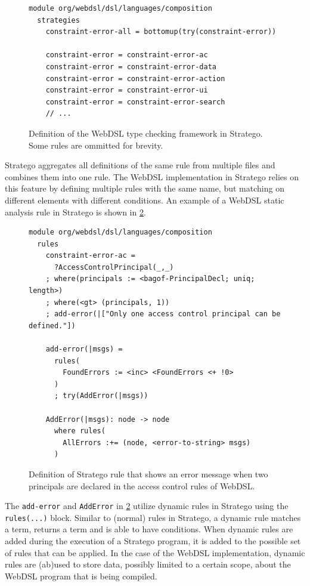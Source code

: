      \begin{figure}
        \begin{verbatim}
module org/webdsl/dsl/languages/composition
  strategies
    constraint-error-all = bottomup(try(constraint-error))

    constraint-error = constraint-error-ac
    constraint-error = constraint-error-data
    constraint-error = constraint-error-action
    constraint-error = constraint-error-ui
    constraint-error = constraint-error-search
    // ...
        \end{verbatim}
        \caption{\label{fig:webdsl-stratego-constraint-error}Definition of the WebDSL type checking framework in Stratego. Some rules are ommitted for brevity.}
      \end{figure}

      Stratego aggregates all definitions of the same rule from multiple files and combines them into one rule. The WebDSL implementation in Stratego relies on this feature by defining multiple rules with the same name, but matching on different elements with different conditions. An example of a WebDSL static analysis rule in Stratego is shown in \cref{fig:webdsl-stratego-typecheck}.

      \begin{figure}
        \begin{verbatim}
module org/webdsl/dsl/languages/composition
  rules
    constraint-error-ac =
      ?AccessControlPrincipal(_,_)
    ; where(principals := <bagof-PrincipalDecl; uniq; length>)
    ; where(<gt> (principals, 1))
    ; add-error(|["Only one access control principal can be defined."])

    add-error(|msgs) =
      rules(
        FoundErrors := <inc> <FoundErrors <+ !0>
      )
      ; try(AddError(|msgs))

    AddError(|msgs): node -> node
      where rules(
        AllErrors :+= (node, <error-to-string> msgs)
      )
        \end{verbatim}
        \caption{\label{fig:webdsl-stratego-typecheck}Definition of Stratego rule that shows an error message when two principals are declared in the access control rules of WebDSL.}
      \end{figure}

      The \texttt{add-error} and \texttt{AddError} in \cref{fig:webdsl-stratego-typecheck} utilize dynamic rules in Stratego using the \texttt{rules(...)} block. Similar to (normal) rules in Stratego, a dynamic rule matches a term, returns a term and is able to have conditions. When dynamic rules are added during the execution of a Stratego program, it is added to the possible set of rules that can be applied. In the case of the WebDSL implementation, dynamic rules are (ab)used to store data, possibly limited to a certain scope, about the WebDSL program that is being compiled.

